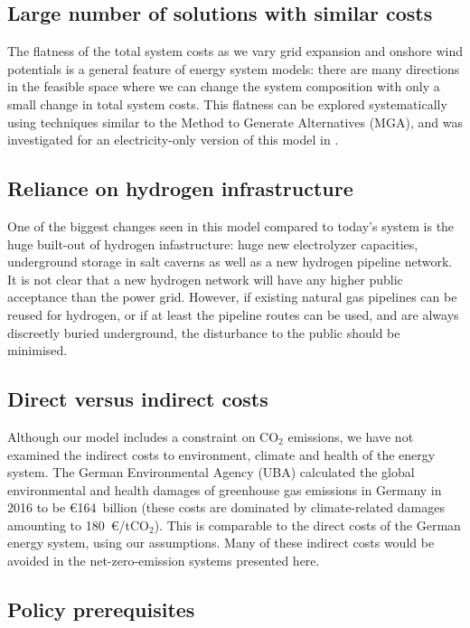 \subsection{Large number of solutions with similar costs}

The flatness of the total system costs as we vary grid expansion and
onshore wind potentials is a general feature of energy system models:
there are many directions in the feasible space where we can change
the system composition with only a small change in total system
costs. This flatness can be explored systematically using techniques similar to the Method to
Generate Alternatives (MGA), and was investigated for an
electricity-only version of this model in \cite{Neumann2019}.

\subsection{Reliance on hydrogen infrastructure}

One of the biggest changes seen in this model compared to today's
system is the huge built-out of hydrogen infastructure: huge new
electrolyzer capacities, underground storage in salt caverns as well
as a new hydrogen pipeline network. It is not clear that a new
hydrogen network will have any higher public acceptance than the power
grid. However, if existing natural gas pipelines can be reused for hydrogen,
or if at least the pipeline routes can be used, and are always discreetly buried underground, the disturbance to
the public should be minimised.


\subsection{Direct versus indirect costs}

Although our model includes a constraint on CO$_2$ emissions, we have
not examined the indirect costs to environment, climate and health of
the energy system. The German Environmental Agency (UBA) calculated
the global environmental and health damages of greenhouse gas
emissions in Germany in 2016 to be \euro164~billion \cite{UBA2019}
(these costs are dominated by climate-related damages amounting to
180~\euro/tCO$_2$). This is comparable to the direct costs of the
German energy system, using our assumptions. Many of these indirect
costs would be avoided in the net-zero-emission systems presented
here.


\subsection{Policy prerequisites}

